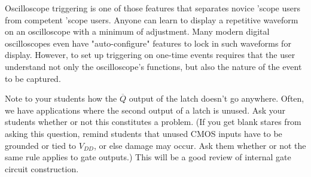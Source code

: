 Oscilloscope triggering is one of those features that separates novice 'scope users from competent 'scope users.  Anyone can learn to display a repetitive waveform on an oscilloscope with a minimum of adjustment.  Many modern digital oscilloscopes even have "auto-configure" features to lock in such waveforms for display.  However, to set up triggering on one-time events requires that the user understand not only the oscilloscope's functions, but also the nature of the event to be captured.

Note to your students how the $\overline{Q}$ output of the latch doesn't go anywhere.  Often, we have applications where the second output of a latch is unused.  Ask your students whether or not this constitutes a problem.  (If you get blank stares from asking this question, remind students that unused CMOS inputs have to be grounded or tied to $V_{DD}$, or else damage may occur.  Ask them whether or not the same rule applies to gate outputs.)  This will be a good review of internal gate circuit construction.




